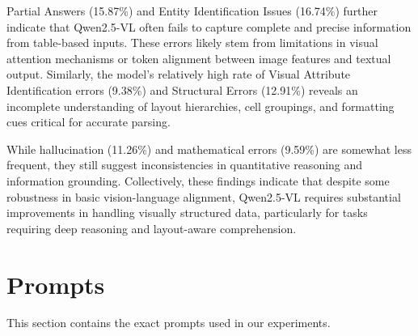 \documentclass[11pt]{article}
\begin{document}
Partial Answers (15.87\%) and Entity Identification Issues (16.74\%) further indicate that Qwen2.5-VL often fails to capture complete and precise information from table-based inputs. These errors likely stem from limitations in visual attention mechanisms or token alignment between image features and textual output. Similarly, the model’s relatively high rate of Visual Attribute Identification errors (9.38\%) and Structural Errors (12.91\%) reveals an incomplete understanding of layout hierarchies, cell groupings, and formatting cues critical for accurate parsing.

While hallucination (11.26\%) and mathematical errors (9.59\%) are somewhat less frequent, they still suggest inconsistencies in quantitative reasoning and information grounding. Collectively, these findings indicate that despite some robustness in basic vision-language alignment, Qwen2.5-VL requires substantial improvements in handling visually structured data, particularly for tasks requiring deep reasoning and layout-aware comprehension.

\section{Prompts}\label{sec:prompt}
This section contains the exact prompts used in our experiments. 
\end{document}
